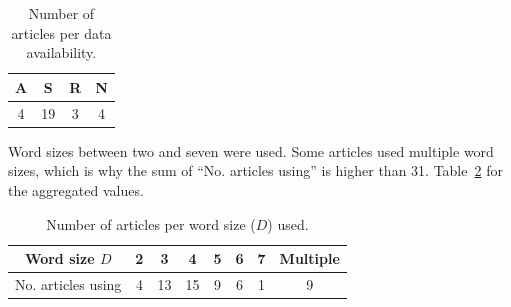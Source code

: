\begin{table}[hbt]
	\centering
	\begin{tabular}{*4{c}}
		\toprule
		A & S  & R & N \\ \midrule
		4 & 19 & 3 & 4 \\ \bottomrule
	\end{tabular}
	\caption{Number of articles per data availability.}\label{tab:ArticlesPerData}
\end{table}

Word sizes between two and seven were used. 
Some articles used multiple word sizes, which is why the sum of ``No. articles using'' is higher than \num{31}.
Table~\ref{tab:ArticlesPerD} for the aggregated values.

\begin{table}[hbt]
\centering
\begin{tabular}{*8{c}}
\toprule
Word size $D$ & 2 & 3  & 4  & 5 & 6 & 7 & Multiple \\ \midrule
No. articles using  & 4 & 13 & 15 & 9 & 6 & 1 & 9        \\ \bottomrule
\end{tabular}
\caption{Number of articles per word size ($D$) used.}\label{tab:ArticlesPerD}
\end{table}


